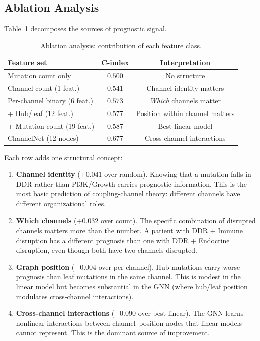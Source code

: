 \documentclass[11pt]{article}
\begin{document}
\subsection{Ablation Analysis}
\label{sec:ablation}

Table~\ref{tab:ablation} decomposes the sources of prognostic
signal.

\begin{table}[ht]
\centering
\caption{Ablation analysis: contribution of each feature class.}
\label{tab:ablation}
\begin{tabular}{@{}lcc@{}}
\toprule
Feature set & C-index & Interpretation \\
\midrule
Mutation count only & $0.500$ & No structure \\
Channel count (1 feat.) & $0.541$ & Channel identity matters \\
Per-channel binary (6 feat.) & $0.573$ & \emph{Which} channels matter \\
+ Hub/leaf (12 feat.) & $0.577$ & Position within channel matters \\
+ Mutation count (19 feat.) & $0.587$ & Best linear model \\
\midrule
ChannelNet (12 nodes) & $0.677$ & Cross-channel interactions \\
\bottomrule
\end{tabular}
\end{table}

Each row adds one structural concept:

\begin{enumerate}
\item \textbf{Channel identity} ($+0.041$ over random). Knowing
   that a mutation falls in DDR rather than PI3K/Growth carries
   prognostic information. This is the most basic prediction of
   coupling-channel theory: different channels have different
   organizational roles.
\item \textbf{Which channels} ($+0.032$ over count). The
   specific combination of disrupted channels matters more than
   the number. A patient with DDR + Immune disruption has a
   different prognosis than one with DDR + Endocrine disruption,
   even though both have two channels disrupted.
\item \textbf{Graph position} ($+0.004$ over per-channel).
   Hub mutations carry worse prognosis than leaf mutations in
   the same channel. This is modest in the linear model but
   becomes substantial in the GNN (where hub/leaf position
   modulates cross-channel interactions).
\item \textbf{Cross-channel interactions} ($+0.090$ over best
   linear). The GNN learns nonlinear interactions between
   channel--position nodes that linear models cannot represent.
   This is the dominant source of improvement.
\end{enumerate}
\end{document}
